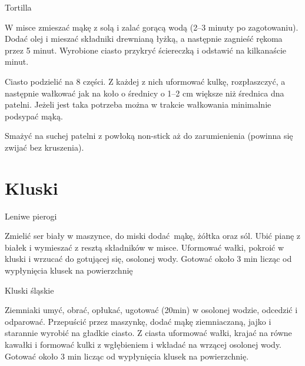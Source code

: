 \documentclass[a4paper,12pt]{article}
\begin{document}
\begin{recipe}{Tortilla}{}{}

W misce zmieszać mąkę z solą i zalać gorącą wodą (2--3 minuty po zagotowaniu).
Dodać olej i mieszać składniki drewnianą łyżką, a następnie zagnieść rękoma przez 5 minut.
Wyrobione ciasto przykryć ściereczką i odstawić na kilkanaście minut.

\freeform%
Ciasto podzielić na 8 części. Z każdej z nich uformować kulkę, rozpłaszczyć, a następnie wałkować jak na koło o średnicy o 1--2 cm większe niż średnica dna patelni. 
Jeżeli jest taka potrzeba można w trakcie wałkowania minimalnie podsypać mąką. 
 
Smażyć na suchej patelni z powłoką non-stick aż do zarumienienia (powinna się zwijać bez kruszenia).

\end{recipe}


\newpage

\section{Kluski}

\begin{recipe}{Leniwe pierogi}{}{}

Zmielić ser biały w maszynce, do miski dodać mąkę, żółtka oraz sól. Ubić pianę z białek
i wymieszać z resztą składników w misce. Uformować wałki, pokroić w kluski i
wrzucać do gotującej się, osolonej wody.
Gotować około 3 min licząc od wypłynięcia klusek na powierzchnię 

\end{recipe}

\begin{recipe}{Kluski śląskie}{}{}

Ziemniaki umyć, obrać, opłukać, ugotować (20min) w osolonej wodzie, odcedzić i
odparować. Przepuścić przez maszynkę, dodać mąkę ziemniaczaną, jajko i
starannie wyrobić na gładkie ciasto.
\freeform%
Z ciasta uformować wałki, krajać na równe
kawałki i formować kulki z wgłębieniem i wkładać na wrzącej osolonej wody.
Gotować około 3 min licząc od wypłynięcia klusek na powierzchnię. 

\end{recipe}
\end{document}
